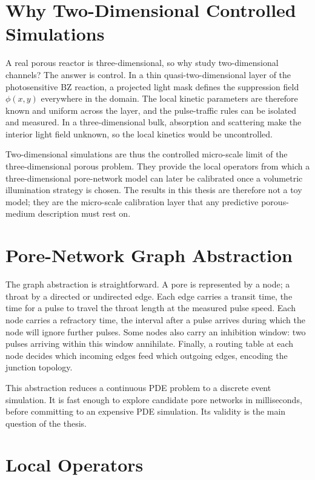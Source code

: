 \section{Why Two-Dimensional Controlled Simulations}
\label{sec:porous_why2d}

A real porous reactor is three-dimensional, so why study two-dimensional channels?
The answer is control.
In a thin quasi-two-dimensional layer of the photosensitive BZ reaction, a projected light mask defines the suppression field $\phi(x,y)$ everywhere in the domain.
The local kinetic parameters are therefore known and uniform across the layer, and the pulse-traffic rules can be isolated and measured.
In a three-dimensional bulk, absorption and scattering make the interior light field unknown, so the local kinetics would be uncontrolled.

Two-dimensional simulations are thus the controlled micro-scale limit of the three-dimensional porous problem.
They provide the local operators from which a three-dimensional pore-network model can later be calibrated once a volumetric illumination strategy is chosen.
The results in this thesis are therefore not a toy model; they are the micro-scale calibration layer that any predictive porous-medium description must rest on.

\section{Pore-Network Graph Abstraction}
\label{sec:porous_graph}

The graph abstraction is straightforward.
A pore is represented by a node; a throat by a directed or undirected edge.
Each edge carries a transit time, the time for a pulse to travel the throat length at the measured pulse speed.
Each node carries a refractory time, the interval after a pulse arrives during which the node will ignore further pulses.
Some nodes also carry an inhibition window: two pulses arriving within this window annihilate.
Finally, a routing table at each node decides which incoming edges feed which outgoing edges, encoding the junction topology.

This abstraction reduces a continuous PDE problem to a discrete event simulation.
It is fast enough to explore candidate pore networks in milliseconds, before committing to an expensive PDE simulation.
Its validity is the main question of the thesis.

\section{Local Operators}
\label{sec:porous_operators}

